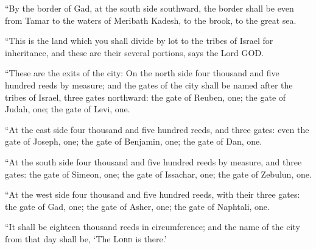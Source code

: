  ``By the border of Gad, at the south side southward, the
border shall be even from Tamar to the waters of Meribath Kadesh, to the
brook, to the great sea.

 ``This is the land which you shall divide by lot to the
tribes of Israel for inheritance, and these are their several portions,
says the Lord GOD.

 ``These are the exits of the city: On the north side
four thousand and five hundred reeds by measure;  and the
gates of the city shall be named after the tribes of Israel, three gates
northward: the gate of Reuben, one; the gate of Judah, one; the gate of
Levi, one.

 ``At the east side four thousand and five hundred reeds,
and three gates: even the gate of Joseph, one; the gate of Benjamin,
one; the gate of Dan, one.

 ``At the south side four thousand and five hundred reeds
by measure, and three gates: the gate of Simeon, one; the gate of
Issachar, one; the gate of Zebulun, one.

 ``At the west side four thousand and five hundred reeds,
with their three gates: the gate of Gad, one; the gate of Asher, one;
the gate of Naphtali, one.

 ``It shall be eighteen thousand reeds in circumference;
and the name of the city from that day shall be, `The \textsc{Lord} is
there.'
